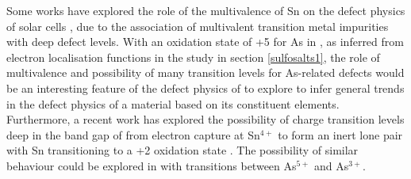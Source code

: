 \documentclass[11pt, twoside]{report}
\begin{document}
Some works have explored the role of the multivalence of Sn on the defect physics of {\CZTS} solar cells \cite{Stephan_Sn_multivalence}, due to the association of multivalent transition metal impurities with deep defect levels. 
With an oxidation state of +5 for As in {\enargite}, as inferred from electron localisation functions in the study in section \ref{sulfosalts1}, the role of multivalence and possibility of many transition levels for As-related defects would be an interesting feature of the defect physics of {\enargite} to explore to infer general trends in the defect physics of a material based on its constituent elements. Furthermore, a recent work has explored the possibility of charge transition levels deep in the band gap of {\CZTS} from electron capture at Sn$^{4+}$ to form an inert lone pair with Sn transitioning to a +2 oxidation state \cite{Sunghyun_defect_arxiv}. The possibility of similar behaviour could be explored in {\enargite} with transitions between As$^{5+}$ and As$^{3+}$.





\end{document}

